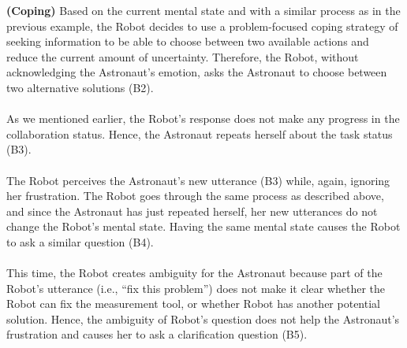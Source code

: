 \noindent\textbf{(Coping)} Based on the current mental state and with a similar
process as in the previous example, the Robot decides to use a problem-focused
coping strategy of seeking information to be able to choose between two
available actions and reduce the current amount of uncertainty. Therefore, the
Robot, without acknowledging the Astronaut's emotion, asks the Astronaut to
choose between two alternative solutions (B2).\\

\noindent{}\\

As we mentioned earlier, the Robot's response does not make any progress in the
collaboration status. Hence, the Astronaut repeats herself about the task status
(B3).\\

\noindent{}\\

The Robot perceives the Astronaut's new utterance (B3) while, again, ignoring
her frustration. The Robot goes through the same process as described above, and
since the Astronaut has just repeated herself, her new utterances do not change
the Robot's mental state. Having the same mental state causes the Robot to ask a
similar question (B4).\\

\noindent{}\\

This time, the Robot creates ambiguity for the Astronaut because part of
the Robot's utterance (i.e., ``fix this problem'') does not make it clear
whether the Robot can fix the measurement tool, or whether Robot has another
potential solution. Hence, the ambiguity of Robot's question does not help the
Astronaut's frustration and causes her to ask a clarification question (B5).\\

